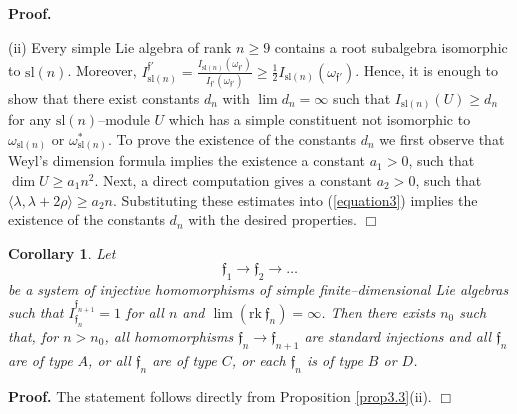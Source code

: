\documentclass[oneside,leqno,12pt]{article}
\newcounter{theorem}
\newtheorem{corollary}[theo]{Corollary}
\newenvironment{proof}{ \noindent \textbf{Proof.}}{\hfill $\Box$}
\def\gf{\mathfrak{f}}
\newcommand {\rk} {\mathrm{rk~}}
\renewcommand{\sl}{\mathrm{sl}}
\begin{document}
\begin{proof}
 
\noindent
(ii) Every simple Lie algebra of rank $n\geq 9$ contains a root subalgebra isomorphic to $\sl(n)$. Moreover, 
$I_{\sl(n)}^{\gf'} = \frac{I_{\sl(n)}(\omega_{\gf'})}{I_{\gf'}(\omega_{\gf'})} \geq \frac{1}{2} I_{\sl(n)} (\omega_{\gf'})$.
Hence, it is enough to show that there exist constants $d_n$ with $\lim d_n = \infty$ such that $I_{\sl(n)}(U) \geq d_n$ for any
$\sl(n)$--module $U$ which has a simple constituent not isomorphic to $\omega_{\sl(n)}$ or 
$\omega_{\sl(n)}^*$. 
To prove the existence of the constants $d_n$ we first observe that Weyl's dimension formula implies the existence a constant 
$a_1>0$, such that $\dim U \geq a_1 n^2$. Next, a direct computation gives a constant $a_2>0$, such that
$\langle\lambda,\lambda+2\rho\rangle\geq a_2 n $. Substituting these estimates into (\ref{equation3}) implies 
the existence of the constants $d_n$ with the desired properties.
\end{proof}

\begin{corollary} \label{corollary15}
Let 
$$
\gf_1 \to \gf_2 \to \dots
$$
be a system of injective homomorphisms of simple finite--dimensional Lie algebras such that $I_{\gf_n}^{\gf_{n+1}} = 1$ 
for all $n$ and $\lim (\rk \gf_n) = \infty$. Then there exists $n_0$ such that, for $n>n_0$, all homomorphisms $\gf_n \to \gf_{n+1}$ are
standard injections and all $\gf_n$ are of type $A$, or all $\gf_n$ are of type
$C$, or each $\gf_n$ is of type $B$ or $D$.
\end{corollary}

\begin{proof}
The statement follows directly from Proposition \ref{prop3.3}(ii).
\end{proof}
\end{document}
